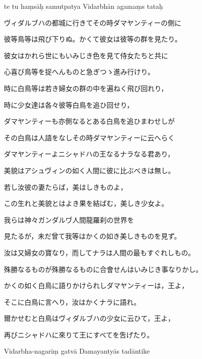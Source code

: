 te tu haṃsāḥ samutpatya Vidarbhān agamaṃs tataḥ \dd

\newpage

ヴィダルブハの都城に行きてその時ダマヤンティーの側に

彼等鳥等は飛び下りぬ。かくて彼女は彼等の群を見たり。

彼女はかれら世にもいみじき色を見て侍女たちと共に

心喜び鳥等を捉へんものと急ぎつゝ進み行けり。

時に白鳥等は若き婦女の群の中を遍ねく飛び回れり，

時に少女達は各々彼等白鳥を追ひ回せり，

ダマヤンティーも亦側なるとある白鳥を追ひまわせしが

その白鳥は人語をなしその時ダマヤンティーに云へらく

ダマヤンティーよニシャドハの王なるナラなる君あり，

美貌はアシュヴィンの如く人間に彼に比ぶべきは無し。

若し汝彼の妻たらば，美はしきものよ，

この生れと美貌とはよき果を結ばむ，美しき少女よ。

我らは神々ガンダルヷ人間龍羅刹の世界を

見たるが，未だ曾て我等はかくの如き美しきものを見ず。

汝は又婦女の寶なり，而してナラは人間の最もすぐれしもの。

殊勝なるものが殊勝なるものに合會せんはいみじき事なりかし。

かくの如く白鳥に語りかけられしダマヤンティーは，王よ，

そこに白鳥に言へり，汝はかくナラに語れ。

爾かせむと白鳥はヴィダルブハの少女に云ひて，王よ，

再びニシャドハに來りて王にすべてを吿げたり。

\newpage

Vidarbha-nagarīṃ gatvā Damayantyās tadāntike \da

